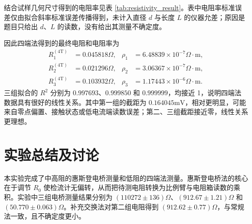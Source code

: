 \documentclass[UTF8,a4paper,12pt]{ctexart}
\begin{document}
结合试样几何尺寸得到的电阻率见表 \ref{tab:resistivity_result}。表中电阻率标准误差仅由拟合斜率标准误差传播得到，未计入直径 $d$ 与长度 $L$ 的仪器允差；原因是题目只给出 $d$、$L$ 的读数，没有给出其测量不确定度。

\begin{table}[H]
\centering
\caption{四端法电阻率计算结果}
\label{tab:resistivity_result}
\end{table}

因此四端法得到的最终电阻和电阻率为
\begin{align*}
  R_1^{(4\mathrm{T})}&=0.045818\Omega, & \rho_1&=6.48839\times10^{-7}\Omega\cdot\mathrm{m},\\
  R_2^{(4\mathrm{T})}&=0.021296\Omega, & \rho_2&=3.06367\times10^{-7}\Omega\cdot\mathrm{m},\\
  R_3^{(4\mathrm{T})}&=0.103932\Omega, & \rho_3&=1.17443\times10^{-6}\Omega\cdot\mathrm{m}.
\end{align*}
三组拟合的 $R^2$ 分别为 $0.997693$、$0.999850$ 和 $0.999999$，均接近 1，说明四端法数据具有很好的线性关系。其中第一组的截距为 $0.164045\mathrm{mV}$，相对更明显，可能来自零点偏置、接触状态或低电流端读数误差；第二、三组截距接近零，线性关系更理想。

\section{实验总结及讨论}

本实验完成了中高阻的惠斯登电桥测量和低阻的四端法测量。惠斯登电桥法的核心在于调节 $R_0$ 使检流计无偏转，从而把待测电阻转换为比例臂与电阻箱读数的乘积。实验中三组电桥测量结果分别为 $(110272\pm136)\Omega$、$(912.67\pm1.21)\Omega$ 和 $(50.770\pm0.063)\Omega$。补充交换法对第二组电阻得到 $(912.62\pm0.77)\Omega$，与常规法一致，且不确定度更小。
\end{document}
